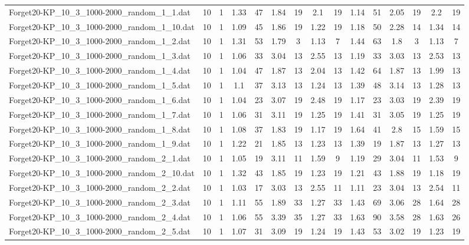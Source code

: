 \begin{table}[!ht]
{\begin{tabular}{lcccccccccccccc}
Forget20-KP\_10\_3\_1000-2000\_random\_1\_1.dat & 10 & 1 & 1.33 & 47 & 1.84 & 19 & 2.1 & 19 & 1.14 & 51 & 2.05 & 19 & 2.2 & 19 \\
Forget20-KP\_10\_3\_1000-2000\_random\_1\_10.dat & 10 & 1 & 1.09 & 45 & 1.86 & 19 & 1.22 & 19 & 1.18 & 50 & 2.28 & 14 & 1.34 & 14 \\
Forget20-KP\_10\_3\_1000-2000\_random\_1\_2.dat & 10 & 1 & 1.31 & 53 & 1.79 & 3 & 1.13 & 7 & 1.44 & 63 & 1.8 & 3 & 1.13 & 7 \\
Forget20-KP\_10\_3\_1000-2000\_random\_1\_3.dat & 10 & 1 & 1.06 & 33 & 3.04 & 13 & 2.55 & 13 & 1.19 & 33 & 3.03 & 13 & 2.53 & 13 \\
Forget20-KP\_10\_3\_1000-2000\_random\_1\_4.dat & 10 & 1 & 1.04 & 47 & 1.87 & 13 & 2.04 & 13 & 1.42 & 64 & 1.87 & 13 & 1.99 & 13 \\
Forget20-KP\_10\_3\_1000-2000\_random\_1\_5.dat & 10 & 1 & 1.1 & 37 & 3.13 & 13 & 1.24 & 13 & 1.39 & 48 & 3.14 & 13 & 1.28 & 13 \\
Forget20-KP\_10\_3\_1000-2000\_random\_1\_6.dat & 10 & 1 & 1.04 & 23 & 3.07 & 19 & 2.48 & 19 & 1.17 & 23 & 3.03 & 19 & 2.39 & 19 \\
Forget20-KP\_10\_3\_1000-2000\_random\_1\_7.dat & 10 & 1 & 1.06 & 31 & 3.11 & 19 & 1.25 & 19 & 1.41 & 31 & 3.05 & 19 & 1.25 & 19 \\
Forget20-KP\_10\_3\_1000-2000\_random\_1\_8.dat & 10 & 1 & 1.08 & 37 & 1.83 & 19 & 1.17 & 19 & 1.64 & 41 & 2.8 & 15 & 1.59 & 15 \\
Forget20-KP\_10\_3\_1000-2000\_random\_1\_9.dat & 10 & 1 & 1.22 & 21 & 1.85 & 13 & 1.23 & 13 & 1.39 & 19 & 1.87 & 13 & 1.27 & 13 \\
Forget20-KP\_10\_3\_1000-2000\_random\_2\_1.dat & 10 & 1 & 1.05 & 19 & 3.11 & 11 & 1.59 & 9 & 1.19 & 29 & 3.04 & 11 & 1.53 & 9 \\
Forget20-KP\_10\_3\_1000-2000\_random\_2\_10.dat & 10 & 1 & 1.32 & 43 & 1.85 & 19 & 1.23 & 19 & 1.21 & 43 & 1.88 & 19 & 1.18 & 19 \\
Forget20-KP\_10\_3\_1000-2000\_random\_2\_2.dat & 10 & 1 & 1.03 & 17 & 3.03 & 13 & 2.55 & 11 & 1.11 & 23 & 3.04 & 13 & 2.54 & 11 \\
Forget20-KP\_10\_3\_1000-2000\_random\_2\_3.dat & 10 & 1 & 1.11 & 55 & 1.89 & 33 & 1.27 & 33 & 1.43 & 69 & 3.06 & 28 & 1.64 & 28 \\
Forget20-KP\_10\_3\_1000-2000\_random\_2\_4.dat & 10 & 1 & 1.06 & 55 & 3.39 & 35 & 1.27 & 33 & 1.63 & 90 & 3.58 & 28 & 1.63 & 26 \\
Forget20-KP\_10\_3\_1000-2000\_random\_2\_5.dat & 10 & 1 & 1.07 & 31 & 3.09 & 19 & 1.24 & 19 & 1.43 & 53 & 3.02 & 19 & 1.23 & 19 \\

\end{tabular}}
\end{table}
